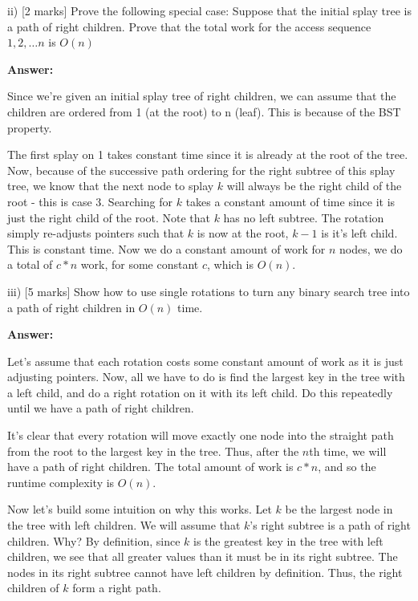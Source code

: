 \documentclass{article}
\begin{document}
ii)  [2 marks] Prove the following special case: Suppose that the initial splay tree is a path of right children.
Prove that the total work for the access sequence $1, 2, \ldots n$ is $O(n)$

\textbf{Answer:}

Since we're given an initial splay tree of right children, we can assume that the children are ordered from 1 (at the
root) to n (leaf). This is because of the BST property.

The first splay on 1 takes constant time since it is already at the root of the tree.  Now, because of the successive
path ordering for the right subtree of this splay tree, we know that the next node to splay $k$ will always be the right
child of the root - this is case 3. Searching for $k$ takes a constant amount of time since it is just the right child
of the root. Note that $k$ has no left subtree. The rotation simply re-adjusts pointers such that $k$ is now at the
root, $k - 1$ is it's left child. This is constant time. Now we do a constant amount of work for $n$ nodes, we do a
total of $c * n$ work, for some constant $c$, which is $O(n)$.



iii)  [5 marks] Show how to use single rotations to turn any binary search tree into a path of
right children in $O(n)$ time.

\textbf{Answer:}

Let's assume that each rotation costs some constant amount of work as it is just adjusting pointers.  Now, all we have
to do is find the largest key in the tree with a left child, and do a right rotation on it with its left child. Do this
repeatedly until we have a path of right children.

It's clear that every rotation will move exactly one node into the straight path from the root to the largest key in the
tree. Thus, after the $n$th time, we will have a path of right children. The total amount of work is $c * n$, and so the
runtime complexity is $O(n)$.

Now let's build some intuition on why this works. Let $k$ be the largest node in the tree with left children. We will
assume that $k$'s right subtree is a path of right children. Why? By definition, since $k$ is the greatest key in the
tree with left children, we see that all greater values than it must be in its right subtree. The nodes in its right
subtree cannot have left children by definition. Thus, the right children of $k$ form a right path.
\end{document}
